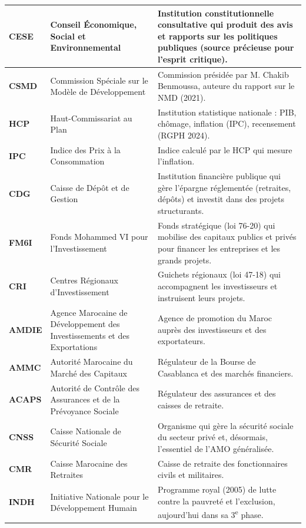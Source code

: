 {\begin{longtable}{|p{1.8cm}|p{4.9cm}|p{8.8cm}|}
\textbf{CESE} & Conseil Économique, Social et Environnemental & Institution constitutionnelle consultative qui produit des avis et rapports sur les politiques publiques (source précieuse pour l'esprit critique). \\ \hline
\textbf{CSMD} & Commission Spéciale sur le Modèle de Développement & Commission présidée par M. Chakib Benmoussa, auteure du rapport sur le NMD (2021). \\ \hline
\textbf{HCP} & Haut-Commissariat au Plan & Institution statistique nationale : PIB, chômage, inflation (IPC), recensement (RGPH 2024). \\ \hline
\textbf{IPC} & Indice des Prix à la Consommation & Indice calculé par le HCP qui mesure l'inflation. \\ \hline
\textbf{CDG} & Caisse de Dépôt et de Gestion & Institution financière publique qui gère l'épargne réglementée (retraites, dépôts) et investit dans des projets structurants. \\ \hline
\textbf{FM6I} & Fonds Mohammed VI pour l'Investissement & Fonds stratégique (loi 76-20) qui mobilise des capitaux publics et privés pour financer les entreprises et les grands projets. \\ \hline
\textbf{CRI} & Centres Régionaux d'Investissement & Guichets régionaux (loi 47-18) qui accompagnent les investisseurs et instruisent leurs projets. \\ \hline
\textbf{AMDIE} & Agence Marocaine de Développement des Investissements et des Exportations & Agence de promotion du Maroc auprès des investisseurs et des exportateurs. \\ \hline
\textbf{AMMC} & Autorité Marocaine du Marché des Capitaux & Régulateur de la Bourse de Casablanca et des marchés financiers. \\ \hline
\textbf{ACAPS} & Autorité de Contrôle des Assurances et de la Prévoyance Sociale & Régulateur des assurances et des caisses de retraite. \\ \hline
\textbf{CNSS} & Caisse Nationale de Sécurité Sociale & Organisme qui gère la sécurité sociale du secteur privé et, désormais, l'essentiel de l'AMO généralisée. \\ \hline
\textbf{CMR} & Caisse Marocaine des Retraites & Caisse de retraite des fonctionnaires civils et militaires. \\ \hline
\textbf{INDH} & Initiative Nationale pour le Développement Humain & Programme royal (2005) de lutte contre la pauvreté et l'exclusion, aujourd'hui dans sa 3\textsuperscript{e} phase. \\ \hline

\end{longtable}}

